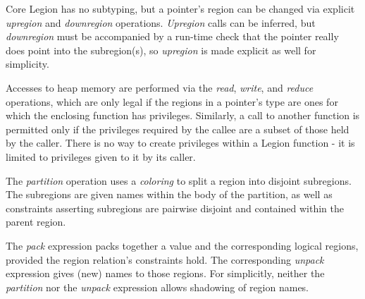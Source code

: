Core Legion has no subtyping, but a pointer's region can be changed via explicit
{\em upregion} and {\em downregion} operations.  {\em Upregion} calls can be inferred,
but {\em downregion} must be accompanied by a run-time check that the pointer really does
point into the subregion(s), so {\em upregion} is made explicit as well for simplicity.

Accesses to heap memory are performed via the {\em read}, {\em write}, and {\em reduce}
operations, which are only legal if the regions in a pointer's type are ones for which the
enclosing function has privileges.
Similarly, a call to another function is permitted only if the privileges required by the 
callee are a subset of those held by the caller.  There is no way to create privileges within
a Legion function - it is limited to privileges given to it by its caller.

The {\em partition} operation uses a {\em coloring} to split a region into 
disjoint subregions.  The subregions are given names within the body of the partition,
as well as constraints asserting subregions are pairwise disjoint and contained within the parent region.

The {\em pack} expression packs together a value and the corresponding logical regions,
provided the region relation's constraints hold.  The
corresponding {\em unpack} expression gives (new) names to those regions.  For simplicitly, neither the 
{\em partition} nor the {\em unpack} expression allows shadowing of region names.

